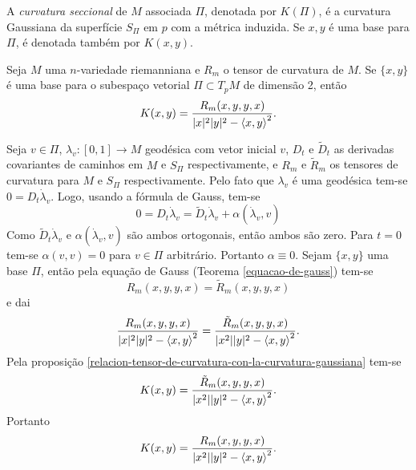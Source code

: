 \begin{definicao}
	A \emph{curvatura seccional} de $M$ associada $\Pi$, denotada por $K(\Pi)$, é a curvatura Gaussiana da superfície $S_{\Pi}$ em $p$ com a métrica induzida. Se $x,y$ é uma base para $\Pi$, é denotada também por $K(x,y)$.
\end{definicao}

\begin{proposicao}
	Seja $M$ uma $n$-variedade riemanniana e
	$R_m$ o tensor de curvatura de $M$.
	Se $\{ x,y \}$ é uma base para o subespaço vetorial $\Pi \subset T_p M$ de dimensão 2, então
	\begin{equation*}
		K(x,y) = \frac{R_m(x,y,y,x)}{|x|^2 |y|^2 - \left\langle x,y \right\rangle^2}.
	\end{equation*}
\end{proposicao}

\begin{demonstracao}
	Seja $v \in \Pi$,
	$\lambda_v: [0,1] \rightarrow M$ geodésica com vetor inicial $v$,
	$D_t$ e $\tilde{D}_t$ as derivadas covariantes de caminhos em $M$ e $S_{\Pi}$ respectivamente, e
	$R_m$ e $\tilde{R}_m$ os tensores de curvatura para $M$ e $S_{\Pi}$ respectivamente.
	Pelo fato que $\lambda_v$ é uma geodésica tem-se $0 = D_t \dot{\lambda}_v$. Logo, usando a fórmula de Gauss, tem-se
	\begin{equation*}
		0 = D_t \dot{\lambda}_v = \tilde{D}_t \dot{\lambda}_v + \alpha(\dot{\lambda}_v, v)
	\end{equation*}
	Como $\tilde{D}_t \dot{\lambda}_v$ e $\alpha(\dot{\lambda}_v,v)$ são ambos ortogonais, então ambos são zero. Para $t=0$ tem-se $\alpha(v,v) = 0$ para $v \in \Pi$ arbitrário. Portanto $\alpha \equiv 0$.
	Sejam $\{x,y\}$ uma base $\Pi$, então pela equação de Gauss (Teorema \ref{equacao-de-gauss}) tem-se
	\begin{equation*}
		R_m(x,y,y,x) = \tilde{R}_m(x,y,y,x)
	\end{equation*}
	e dai
	\begin{equation*}
		\frac{R_m(x,y,y,x)}{|x|^2 |y|^2 - \left\langle x,y \right\rangle^2} = \frac{\tilde{R}_m(x,y,y,x)}{|x^2| |y|^2 - \left\langle x,y \right\rangle^2}.
	\end{equation*}
	Pela proposição \ref{relacion-tensor-de-curvatura-con-la-curvatura-gaussiana} tem-se
	\begin{equation*}
		K(x,y) = \frac{\tilde{R}_m(x,y,y,x)}{|x^2| |y|^2 - \left\langle x,y \right\rangle^2}.
	\end{equation*}
	Portanto
	\begin{equation*}
		K(x,y) = \frac{R_m(x,y,y,x)}{|x^2| |y|^2 - \left\langle x,y \right\rangle^2}.
	\end{equation*}
\end{demonstracao}

